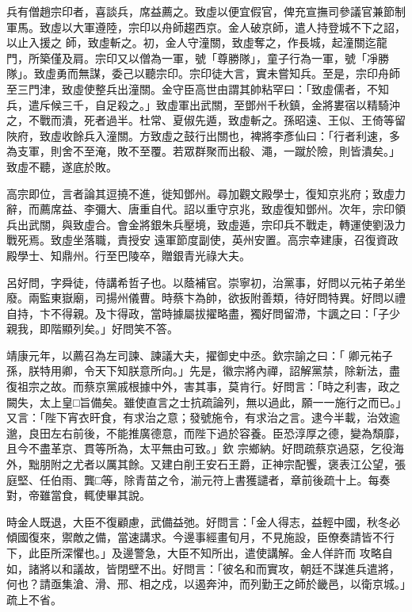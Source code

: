 \begin{pinyinscope}
 兵有僧趙宗印者，喜談兵，席益薦之。致虛以便宜假官，俾充宣撫司參議官兼節制軍馬。致虛以大軍遵陸，宗印以舟師趨西京。金人破京師，遣人持登城不下之詔，以止入援之
 師，致虛斬之。初，金人守潼關，致虛奪之，作長城，起潼關迄龍門，所築僅及肩。宗印又以僧為一軍，號「尊勝隊」，童子行為一軍，號「凈勝隊」。致虛勇而無謀，委己以聽宗印。宗印徒大言，實未嘗知兵。至是，宗印舟師至三門津，致虛使整兵出潼關。金守臣高世由謂其帥粘罕曰：「致虛儒者，不知兵，遣斥候三千，自足殺之。」致虛軍出武關，至鄧州千秋鎮，金將婁宿以精騎沖之，不戰而潰，死者過半。杜常、夏俶先遁，致虛斬之。孫昭遠、王似、王倚等留
 陜府，致虛收餘兵入潼關。方致虛之鼓行出關也，裨將李彥仙曰：「行者利速，多為支軍，則舍不至淹，敗不至覆。若眾群聚而出殽、澠，一蹴於險，則皆潰矣。」致虛不聽，遂底於敗。



 高宗即位，言者論其逗撓不進，徙知鄧州。尋加觀文殿學士，復知京兆府；致虛力辭，而薦席益、李彌大、唐重自代。詔以重守京兆，致虛復知鄧州。次年，宗印領兵出武關，與致虛合。會金將銀朱兵壓境，致虛遁，宗印兵不戰走，轉運使劉汲力戰死焉。致虛坐落職，責授安
 遠軍節度副使，英州安置。高宗幸建康，召復資政殿學士、知鼎州。行至巴陵卒，贈銀青光祿大夫。



 呂好問，字舜徒，侍講希哲子也。以蔭補官。崇寧初，治黨事，好問以元祐子弟坐廢。兩監東嶽廟，司揚州儀曹。時蔡卞為帥，欲扳附善類，待好問特異。好問以禮自持，卞不得親。及卞得政，當時據屬拔擢略盡，獨好問留滯，卞諷之曰：「子少親我，即階顯列矣。」好問笑不答。



 靖康元年，以薦召為左司諫、諫議大夫，擢御史中丞。欽宗諭之曰：「
 卿元祐子孫，朕特用卿，令天下知朕意所向。」先是，徽宗將內禪，詔解黨禁，除新法，盡復祖宗之故。而蔡京黨戚根據中外，害其事，莫肯行。好問言：「時之利害，政之闕失，太上皇□旨備矣。雖使直言之士抗疏論列，無以過此，願一一施行之而已。」又言：「陛下宵衣旰食，有求治之意；發號施令，有求治之言。逮今半載，治效逾邈，良田左右前後，不能推廣德意，而陛下過於容養。臣恐淳厚之德，變為頹靡，且今不盡革京、貫等所為，太平無由可致。」欽
 宗鄉納。好問疏蔡京過惡，乞役海外，黜朋附之尤者以厲其餘。又建白削王安石王爵，正神宗配饗，褒表江公望，張庭堅、任伯雨、龔□等，除青苗之令，湔元符上書獲譴者，章前後疏十上。每奏對，帝雖當食，輒使畢其說。



 時金人既退，大臣不復顧慮，武備益弛。好問言：「金人得志，益輕中國，秋冬必傾國復來，禦敵之備，當速講求。今邊事經畫旬月，不見施設，臣僚奏請皆不行下，此臣所深懼也。」及邊警急，大臣不知所出，遣使講解。金人佯許而
 攻略自如，諸將以和議故，皆閉壁不出。好問言：「彼名和而實攻，朝廷不謀進兵遣將，何也？請亟集滄、滑、邢、相之戍，以遏奔沖，而列勤王之師於畿邑，以衛京城。」疏上不省。




\end{pinyinscope}
